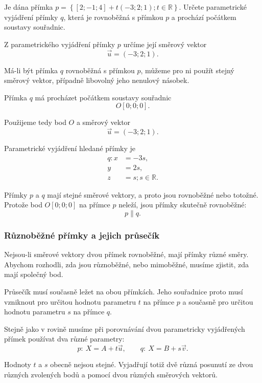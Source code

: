 \begin{example}
    \label{exa:Parallel_line_through_origin_space}
    Je dána přímka $p=\left\{\left[2;-1;4\right] + t\left(-3;2;1\right) ; t\in\mathbb{R}\right\}$.
    Určete parametrické vyjádření přímky $q$, která je rovnoběžná
    s přímkou $p$ a prochází počátkem soustavy souřadnic.

    Z parametrického vyjádření přímky $p$ určíme její směrový vektor
    \[
        \vec{u}=(-3;2;1).
    \]

    Má-li být přímka $q$ rovnoběžná s přímkou $p$, můžeme pro ni použít
    stejný směrový vektor, případně libovolný jeho nenulový násobek.

    Přímka $q$ má procházet počátkem soustavy souřadnic
    \[
        O[0;0;0].
    \]

    Použijeme tedy bod $O$ a směrový vektor
    \[
        \vec{u}=(-3;2;1).
    \]

    Parametrické vyjádření hledané přímky je
    \[
        \begin{aligned}
            q: x&=-3s,\\
            y&=2s,\\
            z&=s; s\in\mathbb{R}.
        \end{aligned}
    \]

    Přímky $p$ a $q$ mají stejné směrové vektory, a proto jsou
    rovnoběžné nebo totožné. Protože bod $O[0;0;0]$ na přímce $p$
    neleží, jsou přímky skutečně rovnoběžné:
    \[
        p\parallel q.
    \]
\end{example}

\subsubsection{Různoběžné přímky a jejich průsečík}
\label{subsubsec:Intersecting_parametric_lines_space}

Nejsou-li směrové vektory dvou přímek rovnoběžné, mají přímky
různé směry. Abychom rozhodli, zda jsou různoběžné, nebo mimoběžné,
musíme zjistit, zda mají společný bod.

Průsečík musí současně ležet na obou přímkách. Jeho souřadnice proto
musí vzniknout pro určitou hodnotu parametru $t$ na přímce $p$
a současně pro určitou hodnotu parametru $s$ na přímce $q$.

\begin{remark}
    Stejně jako v rovině musíme při porovnávání dvou parametricky
    vyjádřených přímek používat dva různé parametry:
    \[
        p:\ X=A+t\vec{u},
        \qquad
        q:\ X=B+s\vec{v}.
    \]

    Hodnoty $t$ a $s$ obecně nejsou stejné. Vyjadřují totiž dvě
    různá posunutí ze dvou různých zvolených bodů a pomocí dvou
    různých směrových vektorů.
\end{remark}

